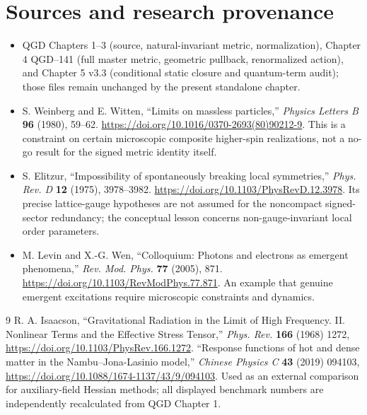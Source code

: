 \documentclass[11pt,a4paper]{article}
\theoremstyle{definition}\newtheorem{definition}[theorem]{Definition}
\theoremstyle{remark}\newtheorem{remark}[theorem]{Remark}
\begin{document}
\section*{Sources and research provenance}
\begin{itemize}
\item QGD Chapters 1--3 (source, natural-invariant metric, normalization), Chapter 4 QGD--141 (full master metric, geometric pullback, renormalized action), and Chapter 5 v3.3 (conditional static closure and quantum-term audit); those files remain unchanged by the present standalone chapter.
\item S. Weinberg and E. Witten, ``Limits on massless particles,'' \emph{Physics Letters B} \textbf{96} (1980), 59--62. \url{https://doi.org/10.1016/0370-2693(80)90212-9}. This is a constraint on certain microscopic composite higher-spin realizations, not a no-go result for the signed metric identity itself.
\item S. Elitzur, ``Impossibility of spontaneously breaking local symmetries,'' \emph{Phys. Rev. D} \textbf{12} (1975), 3978--3982. \url{https://doi.org/10.1103/PhysRevD.12.3978}. Its precise lattice-gauge hypotheses are not assumed for the noncompact signed-sector redundancy; the conceptual lesson concerns non-gauge-invariant local order parameters.
\item M. Levin and X.-G. Wen, ``Colloquium: Photons and electrons as emergent phenomena,'' \emph{Rev. Mod. Phys.} \textbf{77} (2005), 871. \url{https://doi.org/10.1103/RevModPhys.77.871}. An example that genuine emergent excitations require microscopic constraints and dynamics.
\end{itemize}
\begin{thebibliography}{9}
 R. A. Isaacson, ``Gravitational Radiation in the Limit of High Frequency. II. Nonlinear Terms and the Effective Stress Tensor,'' \emph{Phys. Rev.} \textbf{166} (1968) 1272, \url{https://doi.org/10.1103/PhysRev.166.1272}.
 ``Response functions of hot and dense matter in the Nambu--Jona-Lasinio model,'' \emph{Chinese Physics C} \textbf{43} (2019) 094103, \url{https://doi.org/10.1088/1674-1137/43/9/094103}. Used as an external comparison for auxiliary-field Hessian methods; all displayed benchmark numbers are independently recalculated from QGD Chapter 1.
\end{thebibliography}
\appendix
\end{document}
